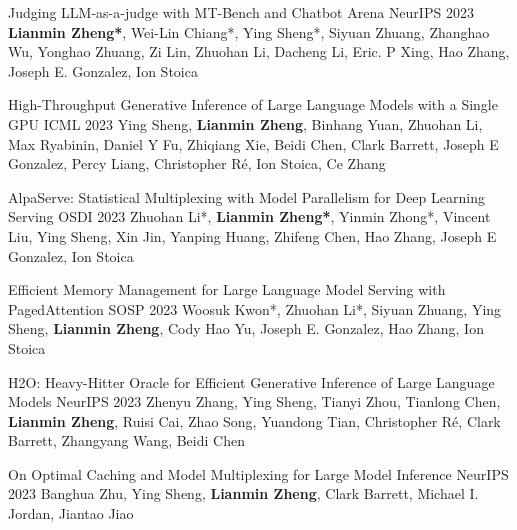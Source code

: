 
\begin{cventries}


\cventry
{}
{Judging LLM-as-a-judge with MT-Bench and Chatbot Arena} %
{NeurIPS 2023} %
{} %
{\textbf{Lianmin Zheng*}, Wei-Lin Chiang*, Ying Sheng*, Siyuan Zhuang, Zhanghao Wu, Yonghao Zhuang, Zi Lin, Zhuohan Li, Dacheng Li, Eric. P Xing, Hao Zhang, Joseph E. Gonzalez, Ion Stoica}

\cventry
{}
{High-Throughput Generative Inference of Large Language Models with a Single GPU} %
{ICML 2023} %
{} %
{Ying Sheng, \textbf{Lianmin Zheng}, Binhang Yuan, Zhuohan Li, Max Ryabinin, Daniel Y Fu, Zhiqiang Xie, Beidi Chen, Clark Barrett, Joseph E Gonzalez, Percy Liang, Christopher Ré, Ion Stoica, Ce Zhang}

\cventry
{}
{AlpaServe: Statistical Multiplexing with Model Parallelism for Deep Learning Serving} %
{OSDI 2023} %
{} %
{Zhuohan Li*, \textbf{Lianmin Zheng*}, Yinmin Zhong*, Vincent Liu, Ying Sheng, Xin Jin, Yanping Huang, Zhifeng Chen, Hao Zhang, Joseph E Gonzalez, Ion Stoica}

\cventry
{}
{Efficient Memory Management for Large Language Model Serving with PagedAttention} %
{SOSP 2023} %
{} %
{Woosuk Kwon*, Zhuohan Li*, Siyuan Zhuang, Ying Sheng, \textbf{Lianmin Zheng}, Cody Hao Yu, Joseph E. Gonzalez, Hao Zhang, Ion Stoica}

\cventry
{}
{H2O: Heavy-Hitter Oracle for Efficient Generative Inference of Large Language Models} %
{NeurIPS 2023} %
{} %
{Zhenyu Zhang, Ying Sheng, Tianyi Zhou, Tianlong Chen, \textbf{Lianmin Zheng}, Ruisi Cai, Zhao Song, Yuandong Tian, Christopher Ré, Clark Barrett, Zhangyang Wang, Beidi Chen}

\cventry
{}
{On Optimal Caching and Model Multiplexing for Large Model Inference} %
{NeurIPS 2023} %
{} %
{Banghua Zhu, Ying Sheng, \textbf{Lianmin Zheng}, Clark Barrett, Michael I. Jordan, Jiantao Jiao}


\end{cventries}
